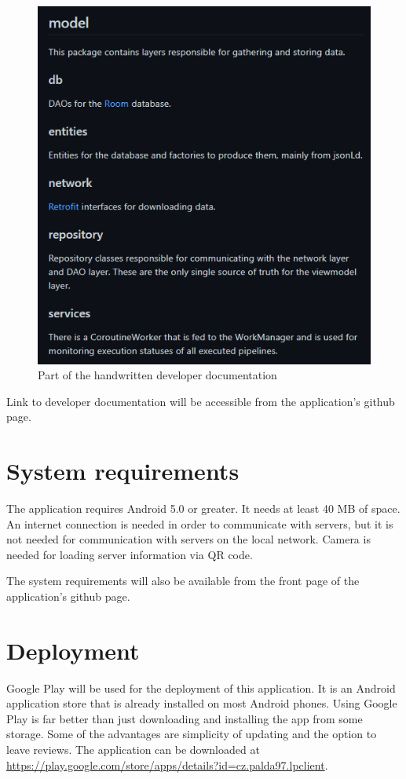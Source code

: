 \begin{figure}\centering
	\includegraphics[width=1\textwidth]{pics/developerDocumentation.png}
	\caption[Part of the handwritten developer documentation]{Part of the handwritten developer documentation}\label{fig:developerdocumentation}
\end{figure}

Link to developer documentation will be accessible from the application's github page.

\section{System requirements}
The application requires Android 5.0 or greater.
It needs at least 40 MB of space.
An internet connection is needed in order to communicate with servers, but it is not needed for communication with servers on the local network.
Camera is needed for loading server information via QR code.

The system requirements will also be available from the front page of the application's github page.

\section{Deployment}
Google Play will be used for the deployment of this application.
It is an Android application store that is already installed on most Android phones.
Using Google Play is far better than just downloading and installing the app from some storage.
Some of the advantages are simplicity of updating and the option to leave reviews.
The application can be downloaded at \url{https://play.google.com/store/apps/details?id=cz.palda97.lpclient}.